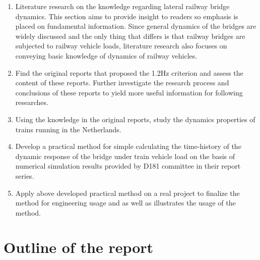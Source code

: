 \begin{enumerate}

\item Literature research on the knowledge regarding lateral railway bridge dynamics. This section aims to provide insight to readers so emphasis is placed on fundamental information. Since general dynamics of the bridges are widely discussed and the only thing that differs is that railway bridges are subjected to railway vehicle loads, literature research also focuses on conveying basic knowledge of dynamics of railway vehicles.

\item Find the original reports that proposed the 1.2Hz criterion and assess the content of these reports. Further investigate the research process and conclusions of these reports to yield more useful information for following researches.

\item Using the knowledge in the original reports, study the dynamics properties of trains running in the Netherlands.

\item Develop a practical method for simple calculating the time-history of the dynamic response of the bridge under train vehicle load on the basis of numerical simulation results provided by D181 committee in their report series.

\item Apply above developed practical method on a real project to finalize the method for engineering usage and as well as illustrates the usage of the method.

\end{enumerate}

\newpage
\section{Outline of the report}


